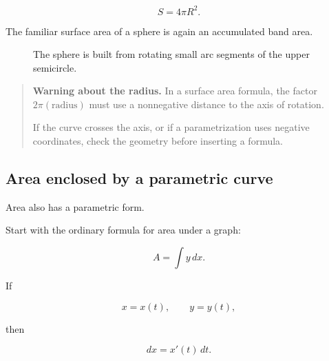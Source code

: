 \[
\boxed{
S=4\pi R^2.
}
\]

The familiar surface area of a sphere is again an accumulated band area.

\begin{figure}[h]
\centering
{}
\caption{The sphere is built from rotating small arc segments of the upper semicircle.}
\label{fig:sphere-from-parametric-semicircle}
\end{figure}

\begin{quote}
\textbf{Warning about the radius.}
In a surface area formula, the factor \(2\pi(\text{radius})\) must use a nonnegative
distance to the axis of rotation.

If the curve crosses the axis, or if a parametrization uses negative coordinates, check
the geometry before inserting a formula.
\end{quote}

\subsection{Area enclosed by a parametric curve}
\label{subsec:area-enclosed-parametric-curve}

Area also has a parametric form.

Start with the ordinary formula for area under a graph:

\[
A=\int y\,dx.
\]

If

\[
x=x(t),
\qquad
y=y(t),
\]

then

\[
dx=x'(t)\,dt.
\]

